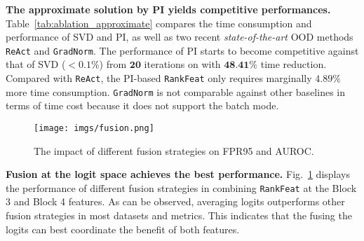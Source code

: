 \noindent \textbf{The approximate solution by PI yields competitive performances.} Table~\ref{tab:ablation_approximate} compares the time consumption and performance of SVD and PI, as well as two recent \emph{state-of-the-art} OOD methods \texttt{ReAct} and \texttt{GradNorm}. The performance of PI starts to become competitive against that of SVD (${<}0.1\%$) from $\textbf{20}$ iterations on with $\textbf{48.41\%}$ time reduction. Compared with \texttt{ReAct}, the PI-based \texttt{RankFeat} only requires marginally $4.89\%$ more time consumption. \texttt{GradNorm} is not comparable against other baselines in terms of time cost because it does not support the batch mode.


\begin{figure}[htbp]
    \centering
    \texttt{[image: imgs/fusion.png]}
    \caption{The impact of different fusion strategies on FPR95 and AUROC.}
    \label{fig:fusion}
\end{figure}

\noindent \textbf{Fusion at the logit space achieves the best performance.} Fig.~\ref{fig:fusion} displays the performance of different fusion strategies in combining \texttt{RankFeat} at the Block 3 and Block 4 features. As can be observed, averaging logits outperforms other fusion strategies in most datasets and metrics. This indicates that the fusing the logits can best coordinate the benefit of both features.   































































